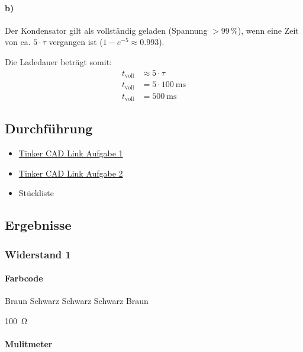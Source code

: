 \paragraph{b)} Der Kondensator gilt als vollständig geladen (Spannung $> 99\,\%$), wenn eine Zeit von ca. $5 \cdot \tau$ vergangen ist ($1 - e^{-5} \approx 0.993$).

\noindent Die Ladedauer beträgt somit:
\begin{align*}
    t_{\text{voll}} &\approx 5 \cdot \tau \\
    t_{\text{voll}} &= 5 \cdot \SI{100}{\milli\second} \\
    t_{\text{voll}} &= \SI{500}{\milli\second}
\end{align*}

\subsection{Durchführung}

\begin{itemize}
    \item \href{https://www.tinkercad.com/things/6dP6bOFcvVJ-4-widerstandsmessung?sharecode=cloxrV9fQVUj9Cfl4C-4CEYhAw4g13SRQi1Q5vM9bJg}{Tinker CAD Link Aufgabe 1}
    \item \href{https://www.tinkercad.com/things/84XtVuCZHAm-4-kapazitatsmessung?sharecode=4kCbAaRwm3v1nCWt6jAq8217Vbh7pe0KWzrzvLyUI0Q}{Tinker CAD Link Aufgabe 2}
    \item Stückliste
\end{itemize}

\newpage
\subsection{Ergebnisse}

\subsubsection{Widerstand 1}

\paragraph{Farbcode}

Braun Schwarz Schwarz Schwarz Braun

\SI{100}{\ohm}

\paragraph{Mulitmeter}

